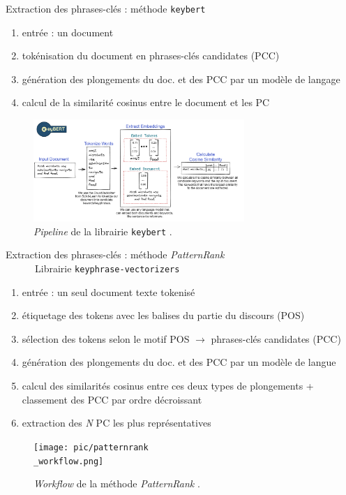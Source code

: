 \begin{frame}{Extraction des phrases-clés : méthode \texttt{keybert}}
	\begin{enumerate}
		\small
		\item entrée : un document
		\item tokénisation du document en phrases-clés candidates (PCC)
		\item génération des plongements du doc. et des PCC par un modèle de langage
		\item calcul de la similarité cosinus entre le document et les PC
	\end{enumerate}
	\begin{figure}
		\centering
		\includegraphics[width=80mm,scale=0.5]{pic/keybert.png}
		\caption{\textit{Pipeline} de la librairie \texttt{keybert} \citep{grootendorst2020keybert}.}
		\label{fig:enter-label}
	\end{figure}
\end{frame}

\begin{frame}{Extraction des phrases-clés : méthode \textit{PatternRank}\\
		\quad \quad \quad\ \quad \quad \quad \quad \quad \quad \quad \ \ \ \ \ \small{Librairie \texttt{keyphrase-vectorizers}}}
	\begin{enumerate}
		\small
		\item entrée : un seul document texte tokenisé
		\item étiquetage des tokens avec les balises du partie du discours (POS)
		\item sélection des tokens selon le motif POS $\rightarrow$ phrases-clés candidates (PCC)
		\item génération des plongements du doc. et des PCC par un modèle de langue
		\item calcul des similarités cosinus entre ces deux types de plongements +  \\classement des PCC par ordre décroissant
		\item extraction des \textit{N} PC les plus représentatives
	\end{enumerate}
	\begin{figure}
		\centering
		\texttt{[image: pic/patternrank\\\_workflow.png]}
		\caption{\textit{Workflow} de la méthode \textit{PatternRank} \citep{schopf2022}.}
		\label{fig:enter-label}
	\end{figure}
\end{frame}


